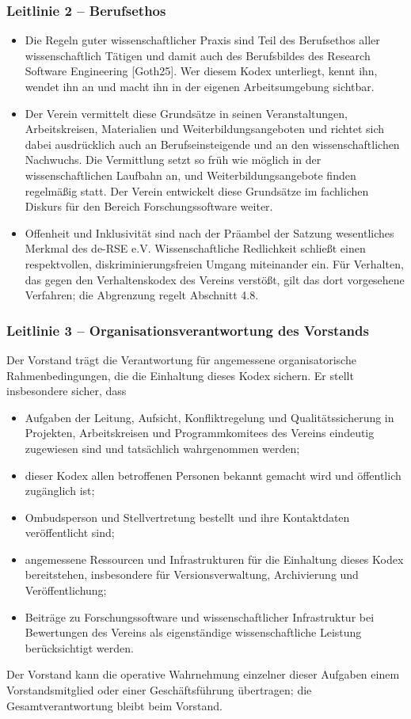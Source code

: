 \documentclass[a4paper, fontsize=11pt]{scrartcl}
\begin{document}
\subsubsection*{Leitlinie 2 -- Berufsethos}
\begin{itemize}
  \item Die Regeln guter wissenschaftlicher Praxis sind Teil des Berufsethos aller wissenschaftlich Tätigen und damit auch des Berufsbildes des Research Software Engineering [Goth25]. Wer diesem Kodex unterliegt, kennt ihn, wendet ihn an und macht ihn in der eigenen Arbeitsumgebung sichtbar.
  \item Der Verein vermittelt diese Grundsätze in seinen Veranstaltungen, Arbeitskreisen, Materialien und Weiterbildungsangeboten und richtet sich dabei ausdrücklich auch an Berufseinsteigende und an den wissenschaftlichen Nachwuchs. Die Vermittlung setzt so früh wie möglich in der wissenschaftlichen Laufbahn an, und Weiterbildungsangebote finden regelmäßig statt. Der Verein entwickelt diese Grundsätze im fachlichen Diskurs für den Bereich Forschungssoftware weiter.
  \item Offenheit und Inklusivität sind nach der Präambel der Satzung wesentliches Merkmal des de-RSE e.V. Wissenschaftliche Redlichkeit schließt einen respektvollen, diskriminierungsfreien Umgang miteinander ein. Für Verhalten, das gegen den Verhaltenskodex des Vereins verstößt, gilt das dort vorgesehene Verfahren; die Abgrenzung regelt Abschnitt 4.8.
\end{itemize}

\subsubsection*{Leitlinie 3 -- Organisationsverantwortung des Vorstands}
Der Vorstand trägt die Verantwortung für angemessene organisatorische Rahmenbedingungen, die die Einhaltung dieses Kodex sichern. Er stellt insbesondere sicher, dass
\begin{itemize}
  \item Aufgaben der Leitung, Aufsicht, Konfliktregelung und Qualitätssicherung in Projekten, Arbeitskreisen und Programmkomitees des Vereins eindeutig zugewiesen sind und tatsächlich wahrgenommen werden;
  \item dieser Kodex allen betroffenen Personen bekannt gemacht wird und öffentlich zugänglich ist;
  \item Ombudsperson und Stellvertretung bestellt und ihre Kontaktdaten veröffentlicht sind;
  \item angemessene Ressourcen und Infrastrukturen für die Einhaltung dieses Kodex bereitstehen, insbesondere für Versionsverwaltung, Archivierung und Veröffentlichung;
  \item Beiträge zu Forschungssoftware und wissenschaftlicher Infrastruktur bei Bewertungen des Vereins als eigenständige wissenschaftliche Leistung berücksichtigt werden.
\end{itemize}
Der Vorstand kann die operative Wahrnehmung einzelner dieser Aufgaben einem Vorstandsmitglied oder einer Geschäftsführung übertragen; die Gesamtverantwortung bleibt beim Vorstand.
\end{document}
